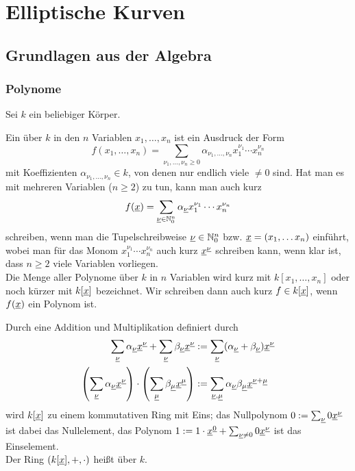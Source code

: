 \section{Elliptische Kurven}
\label{sec:para2}
\nextlecture
\subsection{Grundlagen aus der Algebra}
\subsubsection{Polynome}
	Sei $k$ ein beliebiger Körper. 
	\marginnote{[7]}
	
\begin{defn}[Polynom]
	Ein  über $k$ in den $n$ Variablen $x_1,\dots,x_n$ ist ein Ausdruck der Form
	\[ f(x_1,\dots,x_n) = \sum\limits_{\nu_1,\dots,\nu_n \geq 0} \alpha_{\nu_1, \dots, \nu_n} x_1^{\nu_1} \cdots x_n^{\nu_n} \]
	mit Koeffizienten $\alpha_{\nu_1,\dots,\nu_n} \in k$, von denen nur endlich viele $\neq 0$ sind. 
	Hat man es mit mehreren Variablen ($n \geq 2$) zu tun, kann man auch kurz
	\[ f(\underline{x}) = \sum_{\underline{\nu} \in \mathbb{N}_0^n} \alpha_{\underline{\nu}} x_1^{\nu_1} \cdots x_n^{\nu_n} \]
	schreiben, wenn man die Tupelschreibweise $\underline{\nu} \in \mathbb{N}_0^n$ bzw. $\underline{x} = (x_1, \dots x_n)$ einführt, wobei man für das Monom $x_1^{\nu_1} \cdots x_n^{\nu_n}$ auch kurz $\underline{x}^{\underline{\nu}}$ schreiben kann, wenn klar ist, dass $n \geq 2$ viele Variablen vorliegen. \\
	Die Menge aller Polynome über $k$ in $n$ Variablen wird kurz mit $k[x_1,\dots,x_n]$ oder noch kürzer mit $k[\underline{x}]$ bezeichnet.
	Wir schreiben dann auch kurz $f \in k[\underline{x}]$, wenn $f(\underline{x})$ ein Polynom ist.
\end{defn}

\begin{bem}
	Durch eine Addition und Multiplikation definiert durch
	\begin{equation}
	\begin{aligned}
		\sum_{\underline{\nu}} \alpha_{\underline{\nu}} \underline{x}^{\underline{\nu}} + \sum_{\underline{\nu}} \beta_{\underline{\nu}} \underline{x}^{\underline{\nu}} &:= \sum_{\underline{\nu}} (\alpha_{\underline{\nu}} + \beta_{\underline{\nu}}) \underline{x}^{\underline{\nu}} \\
		\left(\sum_{\underline{\nu}} \alpha_{\underline{\nu}} \underline{x}^{\underline{\nu}}\right) \cdot \left(\sum_{\underline{\mu}} \beta_{\underline{\mu}} \underline{x}^{\underline{\mu}}\right) &:= \sum_{\underline{\nu},\underline{\mu}} \alpha_{\underline{\nu}} \beta_{\underline{\mu}} \underline{x}^{\underline{\nu} + \underline{\mu}}
	\end{aligned}
	\end{equation}
	wird $k[\underline{x}]$ zu einem kommutativen Ring mit Eins; das Nullpolynom $0 := \sum_{\underline{\nu}} 0 \underline{x}^{\underline{\nu}}$ ist dabei das Nullelement, das Polynom $1 := 1 \cdot \underline{x}^{\underline{0}} + \sum_{\underline{\nu} \neq 0} 0 \underline{x}^{\underline{\nu}}$ ist das Einselement. 
	 \\
	Der Ring $(k[\underline{x}],+,\cdot)$ heißt  über $k$.
\end{bem}

